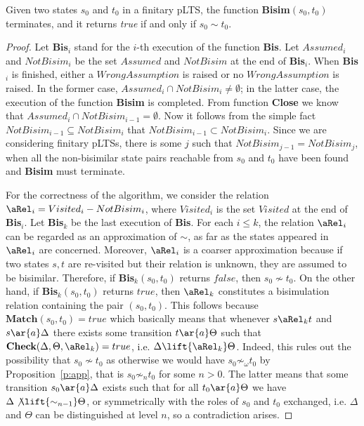 \documentclass{article}
\def \BISI{\sim}
\begin{document}
\begin{theorem}\label{t:correctness}
Given two states $s_0$ and $t_0$ in a finitary pLTS, the function
\textbf{Bisim}$(s_0,t_0)$ terminates, and it returns \emph{true} if
and only if $s_0\sim t_0$.
\end{theorem}
\begin{proof}
Let $\textbf{Bis}_i$ stand for the $i$-th execution of the function
\textbf{Bis}. Let $Assumed_i$ and $NotBisim_i$ be the set $Assumed$
and $NotBisim$ at the end of \textbf{Bis}$_i$. When \textbf{Bis}$_i$
is finished, either a $WrongAssumption$ is raised or no
$WrongAssumption$ is raised. In the former case, $Assumed_i\cap
NotBisim_i\not=\emptyset$; in the latter case, the execution of the
function \textbf{Bisim} is completed. From function \textbf{Close}
we know that $Assumed_i\cap NotBisim_{i-1}=\emptyset$. Now it
follows from the simple fact $NotBisim_{i-1}\subseteq NotBisim_i$
that $NotBisim_{i-1}\subset NotBisim_i$. Since we are considering
finitary pLTSs, there is some $j$ such that
$NotBisim_{j-1}=NotBisim_j$, when all the non-bisimilar state pairs
reachable from $s_0$ and $t_0$ have been found and \textbf{Bisim}
must terminate.

For the correctness of the algorithm, we consider the relation
$\aRel_i=Visited_i-NotBisim_i$, where $Visited_i$ is the set
$Visited$ at the end of \textbf{Bis}$_i$. Let \textbf{Bis}$_k$ be
the last execution of \textbf{Bis}. For each $i\leq k$, the relation
$\aRel_i$ can be regarded as an approximation of $\BISI$, as  far as
the states appeared in $\aRel_i$ are concerned. Moreover, $\aRel_i$
is a coarser approximation because if two states $s,t$ are
re-visited but their relation is unknown, they are assumed to be
bisimilar. Therefore, if \textbf{Bis}$_k(s_0,t_0)$ returns $false$,
then $s_0\not\BISI t_0$. On the other hand, if
\textbf{Bis}$_k(s_0,t_0)$ returns $true$, then $\aRel_k$ constitutes
a bisimulation relation containing the pair $(s_0,t_0)$. This
follows because $\textbf{Match}(s_0,t_0)=true$  which basically
means that whenever $s\aRel_k t$ and $s\ar{a}\Delta$ there exists
some transition $t\ar{a}\Theta$ such that
$\textbf{Check}(\Delta,\Theta,\aRel_k)=true$, i.e.
$\Delta\lift{\aRel_k}\Theta$. Indeed, this rules out the possibility
that $s_0\not\BISI t_0$ as otherwise we would have
$s_0\not\BISI_\omega t_0$ by Proposition~\ref{p:app}, that is
$s_0\not\BISI_n t_0$ for some $n>0$. The latter means that some
transition $s_0\ar{a}\Delta$ exists such that for all
$t_0\ar{a}\Theta$ we have $\Delta\not\lift{\BISI_{n-1}}\Theta$, or
symmetrically with the roles of $s_0$ and $t_0$ exchanged, i.e.
$\Delta$ and $\Theta$ can be distinguished at level $n$, so a
contradiction arises.
\end{proof}
\end{document}

